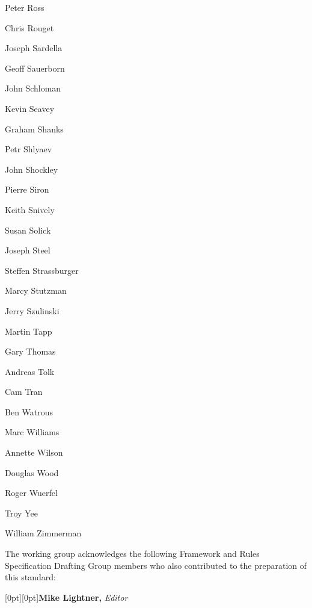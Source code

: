 \begin{minipage}[t]{90pt}
    \frontNamesContinuation
    Peter Ross\par
    Chris Rouget\par
    Joseph Sardella\par
    Geoff Sauerborn\par
    John Schloman\par
    Kevin Seavey\par
    Graham Shanks\par
    Petr Shlyaev\par
    John Shockley\par
    Pierre Siron\par
    Keith Snively\par
    Susan Solick\par
    Joseph Steel\par
    Steffen Strassburger\par
    Marcy Stutzman\par
    Jerry Szulinski\par
    Martin Tapp\par
    Gary Thomas\par
    Andreas Tolk\par
    Cam Tran\par
    Ben Watrous\par
    Marc Williams\par
    Annette Wilson\par
    Douglas Wood\par
    Roger Wuerfel\par
    Troy Yee\par
    William Zimmerman
\end{minipage}\par

\vspace{14.72pt}
The working group acknowledges the following Framework and Rules Specification Drafting Group\linebreak
members who also contributed to the preparation of this standard:\par

\vspace{5.77pt}
\begin{center}
    \frontOfficer\raisebox{3.5pt}[0pt][0pt]{\textbf{Mike Lightner,} \textit{Editor}}\par
\end{center}

